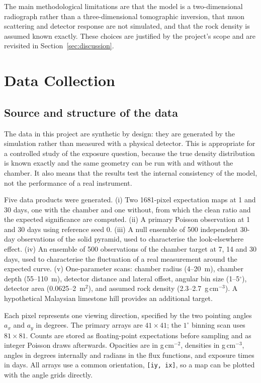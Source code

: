 \documentclass{article}
\begin{document}
The main methodological limitations are that the model is a two-dimensional
radiograph rather than a three-dimensional tomographic inversion, that muon
scattering and detector response are not simulated, and that the rock density
is assumed known exactly. These choices are justified by the project's scope
and are revisited in Section~\ref{sec:discussion}.


\section{Data Collection}
\label{sec:data}

\subsection{Source and structure of the data}

The data in this project are synthetic by design: they are generated by the
simulation rather than measured with a physical detector. This is appropriate
for a controlled study of the exposure question, because the true density
distribution is known exactly and the same geometry can be run with and without
the chamber. It also means that the results test the internal consistency of
the model, not the performance of a real instrument.

Five data products were generated. (i) Two 1681-pixel expectation maps at 1 and
30 days, one with the chamber and one without, from which the clean ratio and
the expected significance are computed. (ii) A primary Poisson observation at 1
and 30 days using reference seed 0. (iii) A null ensemble of 500 independent
30-day observations of the solid pyramid, used to characterise the
look-elsewhere effect. (iv) An ensemble of 500 observations of the chamber
target at 7, 14 and 30 days, used to characterise the fluctuation of a real
measurement around the expected curve. (v) One-parameter scans: chamber radius
(4--20~m), chamber depth (55--110~m), detector distance and lateral offset,
angular bin size (1--5$^\circ$), detector area (0.0625--2~m$^2$), and assumed
rock density (2.3--2.7~g\,cm$^{-3}$). A hypothetical Malaysian limestone hill
provides an additional target.

Each pixel represents one viewing direction, specified by the two pointing
angles $a_x$ and $a_y$ in degrees. The primary arrays are
$41\times41$; the $1^\circ$ binning scan uses $81\times81$. Counts are stored
as floating-point expectations before sampling and as integer Poisson draws
afterwards. Opacities are in g\,cm$^{-2}$, densities in g\,cm$^{-3}$, angles in
degrees internally and radians in the flux functions, and exposure times in
days. All arrays use a common orientation, \texttt{[iy, ix]}, so a map can be
plotted with the angle grids directly.
\end{document}
